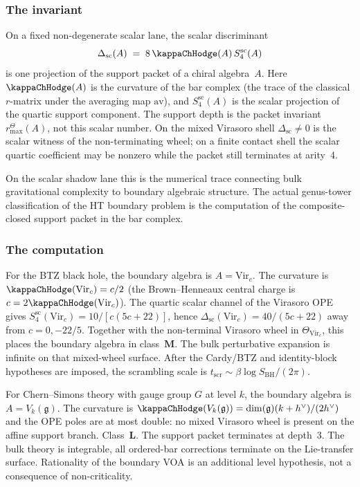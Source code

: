 \subsubsection*{The invariant}

On a fixed non-degenerate scalar lane, the scalar discriminant
\[
 \Delta_{\mathrm{sc}}(A) \;=\;
 8\,\kappaChHodge(A)\,S^{\mathrm{sc}}_4(A)
\]
is one projection of the support packet of a chiral algebra~$A$. Here
$\kappaChHodge(A)$ is the curvature of the bar complex (the trace of the
classical $r$-matrix under the averaging map $\mathrm{av}$), and
$S^{\mathrm{sc}}_4(A)$ is the scalar projection of the quartic support
component.  The support depth is the packet invariant
\(r^\Theta_{\max}(A)\), not this scalar number.  On the mixed Virasoro
shell \(\Delta_{\mathrm{sc}}\ne0\) is the scalar witness of the
non-terminating wheel; on a finite contact shell the scalar quartic
coefficient may be nonzero while the packet still terminates at
arity~$4$.

On the scalar shadow lane this is the numerical trace connecting bulk
gravitational complexity to boundary algebraic structure. The actual
genus-tower classification of the HT boundary problem is the
computation of the composite-closed support packet in the bar complex.

\subsubsection*{The computation}

For the BTZ black hole, the boundary algebra is $A = \mathrm{Vir}_c$.
The curvature is $\kappaChHodge(\mathrm{Vir}_c) = c/2$
(the Brown--Henneaux central charge is
$c = 2\kappaChHodge(\mathrm{Vir}_c)$).
The quartic scalar channel of the Virasoro OPE gives
\(S^{\mathrm{sc}}_4(\mathrm{Vir}_c)=10/[c(5c+22)]\), hence
\(\Delta_{\mathrm{sc}}(\mathrm{Vir}_c)=40/(5c+22)\) away from
\(c=0,-22/5\).  Together with the non-terminal Virasoro wheel in
\(\Theta_{\mathrm{Vir}_c}\), this places the boundary algebra in
class~$\mathbf{M}$. The bulk perturbative expansion is infinite on
that mixed-wheel surface.
After the Cardy/BTZ and identity-block hypotheses are imposed,
the scrambling scale is
$t_{\mathrm{scr}} \sim \beta \log S_{\mathrm{BH}}/(2\pi)$.

For Chern--Simons theory with gauge group $G$ at level $k$,
the boundary algebra is $A = V_k(\mathfrak{g})$. The curvature is
$\kappaChHodge(V_k(\mathfrak{g})) = \dim(\mathfrak{g})(k+h^\vee)/(2h^\vee)$
and the OPE poles are at most double:
no mixed Virasoro wheel is present on the affine support branch.
Class~$\mathbf{L}$. The support packet terminates at depth~$3$.
The bulk theory is integrable, all ordered-bar corrections terminate
on the Lie-transfer surface.
Rationality of the boundary VOA is an additional level hypothesis,
not a consequence of non-criticality.

